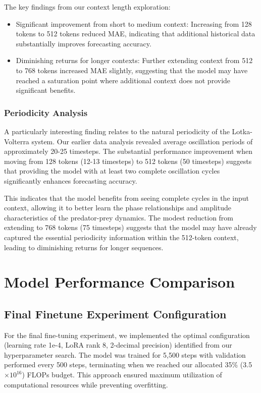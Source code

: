 \documentclass{article}
\begin{document}
The key findings from our context length exploration:
\begin{itemize}
    \item Significant improvement from short to medium context: Increasing from 128 tokens to 512 tokens reduced MAE, indicating that additional historical data substantially improves forecasting accuracy.
    \item Diminishing returns for longer contexts: Further extending context from 512 to 768 tokens increased MAE slightly, suggesting that the model may have reached a saturation point where additional context does not provide significant benefits.
\end{itemize}
\subsubsection*{Periodicity Analysis}
A particularly interesting finding relates to the natural periodicity of the Lotka-Volterra system. Our earlier data analysis revealed average oscillation periods of approximately 20-25 timesteps. The substantial performance improvement when moving from 128 tokens (12-13 timesteps) to 512 tokens (50 timesteps) suggests that providing the model with at least two complete oscillation cycles significantly enhances forecasting accuracy.

This indicates that the model benefits from seeing complete cycles in the input context, allowing it to better learn the phase relationships and amplitude characteristics of the predator-prey dynamics. The modest reduction from extending to 768 tokens (75 timesteps) suggests that the model may have already captured the essential periodicity information within the 512-token context, leading to diminishing returns for longer sequences.

\section*{Model Performance Comparison}
\subsection*{Final Finetune Experiment Configuration}
For the final fine-tuning experiment, we implemented the optimal configuration (learning rate 1e-4, LoRA rank 8, 2-decimal precision) identified from our hyperparameter search. The model was trained for 5,500 steps with validation performed every 500 steps, terminating when we reached our allocated 35\% (3.5$\times 10^{16}$) FLOPs budget. This approach ensured maximum utilization of computational resources while preventing overfitting.
\end{document}
